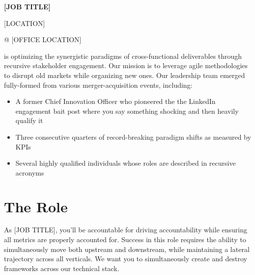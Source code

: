 \documentclass[11pt,a4paper]{article}
\begin{document}

\vspace*{0.5in}

\noindent\textbf{\Large [JOB TITLE]}

\vspace{0.1em}
\noindent\large [LOCATION]

\vspace{0.2em}
 @ [OFFICE LOCATION]

\vspace{2em}

 is optimizing the synergistic paradigms of cross-functional deliverables through recursive stakeholder engagement. Our mission is to leverage agile methodologies to disrupt old markets while organizing new ones. \newline \newline
\noindent Our leadership team emerged fully-formed from various merger-acquisition events, including:
\begin{itemize}
  \item A former Chief Innovation Officer who pioneered the the LinkedIn engagement bait post where you say something shocking and then heavily qualify it
  \item Three consecutive quarters of record-breaking paradigm shifts as measured by KPIs
  \item Several highly qualified individuals whose roles are described in recursive acronyms
\end{itemize}

\section*{The Role}
As [JOB TITLE], you'll be accountable for driving accountability while ensuring all metrics are properly accounted for. Success in this role requires the ability to simultaneously move both upstream and downstream, while maintaining a lateral trajectory across all verticals. We want you to simultaneously create and destroy frameworks across our technical stack.
\end{document}
